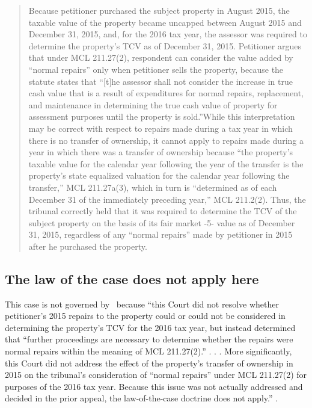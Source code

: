\documentclass[12pt,\documentclassflag]{michiganCourtOfAppealsBrief}
\begin{document}
\begin{quotation}
Because petitioner purchased the subject property in August 2015, the taxable value of the
property became uncapped between August 2015 and December 31, 2015, and, for the 2016 tax
year, the assessor was required to determine the property's TCV as of December 31, 2015.
Petitioner argues that under MCL 211.27(2), respondent can consider the value added by ``normal
repairs'' only when petitioner sells the property, because the statute states that ``[t]he assessor shall
not consider the increase in true cash value that is a result of expenditures for normal repairs,
replacement, and maintenance in determining the true cash value of property for assessment
purposes until the property is sold.''While this interpretation may be correct with respect to repairs
made during a tax year in which there is no transfer of ownership, it cannot apply to repairs made
during a year in which there was a transfer of ownership because ``the property's taxable value for
the calendar year following the year of the transfer is the property's state equalized valuation for
the calendar year following the transfer,'' MCL 211.27a(3), which in turn is ``determined as of each
December 31 of the immediately preceding year,'' MCL 211.2(2). Thus, the tribunal correctly
held that it was required to determine the TCV of the subject property on the basis of its fair market 
-5-
value as of December 31, 2015, regardless of any ``normal repairs'' made by petitioner in 2015
after he purchased the property.
\end{quotation}

\subsection{The law of the case does not apply here}

This case is not governed by \cite[s]{Patru 1}\ because ``this Court did not resolve whether petitioner's 2015 repairs to the property could or could not be considered in determining the property's TCV for the 2016 tax year, but instead
determined that ``further proceedings are necessary to determine whether the repairs were normal
repairs within the meaning of MCL 211.27(2).'' . . . More significantly, this Court
did not address the effect of the property's transfer of ownership in 2015 on the tribunal's
consideration of ``normal repairs'' under MCL 211.27(2) for purposes of the 2016 tax year.
Because this issue was not actually addressed and decided in the prior appeal, the law-of-the-case
doctrine does not apply.'' .
\end{document}
